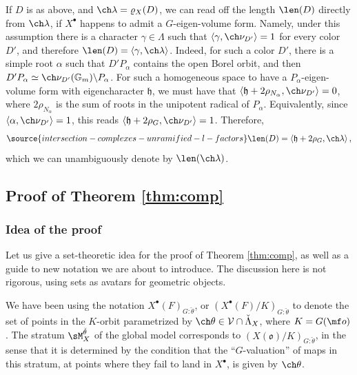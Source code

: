 \begin{rem}
\notready\label{rem:length}
If $D$ is as above, and $\ch\lambda = \varrho_X(D)$, we can read off the length $\len (D)$ directly from $\ch\lambda$, if $X^\bullet$ happens to admit a $G$-eigen-volume form. Namely, under this assumption there is a character $\gamma\in \Lambda$ such that $\left< \gamma, \ch \nu_{D'}\right> = 1$ for every color $D'$, and therefore $\len (D) = \left< \gamma, \ch\lambda\right>$. Indeed, for such a color $D'$, there is a simple root $\alpha$ such that $D'P_\alpha$ contains the open Borel orbit, and then $D'P_\alpha \simeq \ch\nu_{D'}(\mathbb G_m)\backslash P_\alpha$. For such a homogeneous space to have a $P_\alpha$-eigen-volume form with eigencharacter $\mathfrak h$,  we must have that $\left< \mathfrak h+ 2\rho_{N_\alpha}, \ch\nu_{D'}\right> = 0$, where  $2\rho_{N_\alpha}$ is the sum of roots in the unipotent radical of $P_\alpha$. Equivalently, since $\left<\alpha,\ch\nu_{D'}\right>=1$, this reads $\left<\mathfrak h + 2\rho_G, \ch\nu_{D'}\right> = 1$. Therefore,
\begin{equation}\label{e:length}
\source{intersection-complexes-unramified-l-factors}
 \len (D) = \left< \mathfrak h + 2\rho_G, \ch\lambda\right>,
\end{equation}
which we can unambiguously denote by $\len (\ch\lambda)$.
\end{rem}



\subsection{Proof of Theorem \ref{thm:comp}}
\label{proof:comp}

\subsubsection{Idea of the proof}


Let us give a set-theoretic idea for the proof of Theorem \ref{thm:comp}, as well as a guide to new notation we are about to introduce. The discussion here is not rigorous, using sets as avatars for geometric objects.

We have been using the notation $X^\bullet(F)_{G:\check\theta}$, or $(X^\bullet(F)/K)_{G:\check\theta}$ to denote the set of points in the $K$-orbit parametrized by $\ch\theta \in \mathcal V \cap \check\Lambda_X$, where $K = G(\mf o)$. The stratum  $\sM_X^{\check\theta}$ of the global model corresponds to $(X(\mathfrak o)/K)_{G:\check\theta}$, in the sense that it is determined by the condition that the ``$G$-valuation'' of maps in this stratum, at points where they fail to land in $X^\bullet$, is given by $\ch\theta$.

